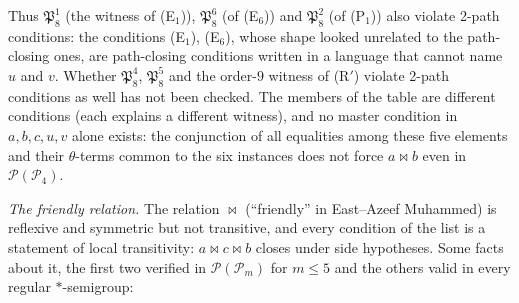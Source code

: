 \documentclass[11pt]{amsart}
\theoremstyle{definition}
\renewcommand{\P}{\mathcal{P}}
\begin{document}
Thus $\mathfrak P_8^1$ (the witness of (E$_1$)), $\mathfrak P_8^6$ (of (E$_6$)) and $\mathfrak P_8^2$ (of (P$_1$)) also violate 2-path conditions: the conditions (E$_1$), (E$_6$), whose shape looked unrelated to the path-closing ones, are path-closing conditions written in a language that cannot name $u$ and $v$. Whether $\mathfrak P_8^4$, $\mathfrak P_8^5$ and the order-$9$ witness of (R$'$) violate 2-path conditions as well has not been checked. The members of the table are different conditions (each explains a different witness), and no master condition in $a,b,c,u,v$ alone exists: the conjunction of all equalities among these five elements and their $\theta$-terms common to the six instances does not force $a\bowtie b$ even in $\P(\P_4)$.

\smallskip
\emph{The friendly relation.} The relation $\bowtie$ (``friendly'' in East--Azeef Muhammed) is reflexive and symmetric but not transitive, and every condition of the list is a statement of local transitivity: $a\bowtie c\bowtie b$ closes under side hypotheses. Some facts about it, the first two verified in $\P(\P_m)$ for $m\le5$ and the others valid in every regular $*$-semigroup:
\end{document}
